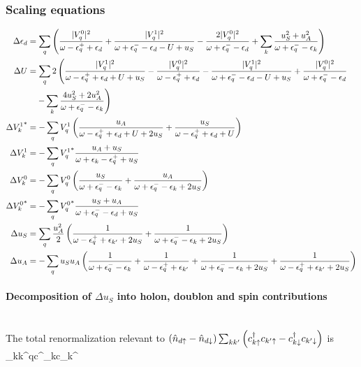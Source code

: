 \documentclass[14pt]{extarticle}
\numberwithin{equation}{section}
\begin{document}
\subsubsection{Scaling equations}
\begin{equation}\begin{aligned}
	\Delta \epsilon_d &= \sum_q \left({\frac{|V_q^0|^2}{\omega - \epsilon_q^+ + \epsilon_d } + \frac{|V_q^1|^2}{\omega + \epsilon^-_q - \epsilon_d  - U + u_S} - \frac{2|V_q^0|^2}{\omega + \epsilon^-_q - \epsilon_d} + \sum_k\frac{u_S^2 + u_A^2}{\omega + \epsilon_q^- - \epsilon_k}}\right)\\
	\Delta U &= \sum_q 2\left(\frac{|V_q^1|^2}{\omega - \epsilon_q^+ + \epsilon_d + U + u_S} - \frac{|V_q^0|^2}{\omega - \epsilon_q^+ + \epsilon_d} - \frac{|V_q^1|^2}{\omega + \epsilon^-_q - \epsilon_d  - U + u_S} +\frac{|V_q^0|^2}{\omega + \epsilon^-_q - \epsilon_d} \right.\\
		 &\quad\left.-\sum_k \frac{4u_S^2 + 2u_A^2}{\omega + \epsilon_q^- - \epsilon_k}\right)\\
	\Delta {V_k^1}^* &=-\sum_q V_q^1\left({\frac{u_A}{\omega - \epsilon_q^+ + \epsilon_d + U + 2u_S} + \frac{u_S}{\omega - \epsilon_q^+ + \epsilon_d + U}}\right) \\
\Delta {V_k^1} &= -\sum_q  {V_q^1}^*\frac{u_A + u_S}{\omega + \epsilon_k - \epsilon_q^+ + u_S}\\
\Delta V_k^0 &= -\sum_q V_q^0\left({\frac{u_S}{\omega + \epsilon_q^- - \epsilon_{k}} + \frac{u_A}{\omega + \epsilon_q^- - \epsilon_{k} + 2u_S}}\right)\\
\Delta {V_k^0}^* &=-\sum_q {V_q^0}^* \frac{u_S + u_A}{\omega + \epsilon_q^- - \epsilon_d + u_S}\\
\Delta u_S &= \sum_q \frac{u_A^2}{2}\left({\frac{1}{\omega - \epsilon_q^+ + \epsilon_{k^\prime}+2u_S} + \frac{1}{\omega + \epsilon_q^- - \epsilon_k + 2u_S}}\right)\\
\Delta u_A &= - \sum_q u_S u_A \left({\frac{1}{\omega + \epsilon_q^-  - \epsilon_{k}} + \frac{1}{\omega - \epsilon_q^+  + \epsilon_{k^\prime}} + \frac{1}{\omega + \epsilon_q^-  - \epsilon_{k} + 2u_S} + \frac{1}{\omega - \epsilon_q^+  + \epsilon_{k^\prime} + 2u_S}}\right)\\
\end{aligned}\end{equation}
\paragraph{Decomposition of \(\Delta u_S\) into holon, doublon and spin contributions}~\\
The total renormalization relevant to \(\left({\hat n_{d\uparrow} - \hat n_{d\downarrow}}\right)\sum_{kk^\prime}\left({c^\dagger_{k\uparrow}c_{k^\prime\uparrow} - c^\dagger_{k\downarrow}c_{k^\prime\downarrow}}\right)\) is
\beq
\sum_{kk^\prime q\beta}c^\dagger_{k\beta}c_{k^\prime\beta}
\eeq
\end{document}

